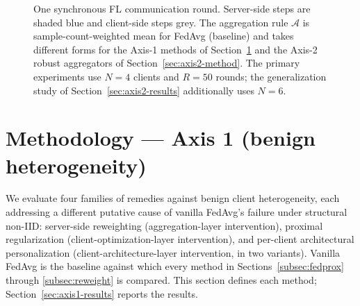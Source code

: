 \documentclass[a4paper,fleqn,doubleblind]{cas-sc}
\begin{document}
\begin{figure}[pos=htbp]
\centering
{}
\caption{One synchronous FL communication round. Server-side steps are shaded blue and client-side steps grey. The aggregation rule $\mathcal{A}$ is sample-count-weighted mean for FedAvg (baseline) and takes different forms for the Axis-1 methods of Section~\ref{sec:axis1-method} and the Axis-2 robust aggregators of Section~\ref{sec:axis2-method}. The primary experiments use $N = 4$ clients and $R = 50$ rounds; the generalization study of Section~\ref{sec:axis2-results} additionally uses $N = 6$.}
\label{fig:round}
\end{figure}


\section{Methodology --- Axis 1 (benign heterogeneity)}
\label{sec:axis1-method}

We evaluate four families of remedies against benign client
heterogeneity, each addressing a different putative cause of
vanilla FedAvg's failure under structural non-IID: server-side
reweighting (aggregation-layer intervention), proximal
regularization (client-optimization-layer intervention), and
per-client architectural personalization (client-architecture-layer
intervention, in two variants). Vanilla FedAvg is the baseline
against which every method in Sections~\ref{subsec:fedprox}
through \ref{subsec:reweight} is compared. This section defines
each method; Section~\ref{sec:axis1-results} reports the results.
\end{document}
